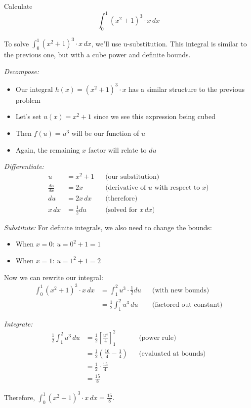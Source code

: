 \documentclass{article}
\begin{document}
  \begin{exercise}
    Calculate 
    \begin{equation}
      \int_0^1 (x^2 + 1)^3 \cdot x \,dx 
    \end{equation}
  \end{exercise}
  \begin{solution}
    To solve $\int_0^1 (x^2 + 1)^3 \cdot x \,dx$, we'll use u-substitution. This integral is similar to the previous one, but with a cube power and definite bounds.
    
    \textit{Decompose:}
    \begin{itemize}
      \item Our integral $h(x) = (x^2 + 1)^3 \cdot x$ has a similar structure to the previous problem
      \item Let's set $u(x) = x^2 + 1$ since we see this expression being cubed
      \item Then $f(u) = u^3$ will be our function of $u$
      \item Again, the remaining $x$ factor will relate to $du$
    \end{itemize}

    \textit{Differentiate:}
    \begin{align*}
      u &= x^2 + 1 && \text{(our substitution)} \\
      \frac{du}{dx} &= 2x && \text{(derivative of $u$ with respect to $x$)} \\
      du &= 2x\,dx && \text{(therefore)} \\
      x\,dx &= \frac{1}{2}du && \text{(solved for $x\,dx$)}
    \end{align*}

    \textit{Substitute:}
    For definite integrals, we also need to change the bounds:
    \begin{itemize}
      \item When $x = 0$: $u = 0^2 + 1 = 1$
      \item When $x = 1$: $u = 1^2 + 1 = 2$
    \end{itemize}
    
    Now we can rewrite our integral:
    \begin{align*}
      \int_0^1 (x^2 + 1)^3 \cdot x \,dx &= \int_1^2 u^3 \cdot \frac{1}{2}du && \text{(with new bounds)} \\
      &= \frac{1}{2}\int_1^2 u^3 \,du && \text{(factored out constant)}
    \end{align*}

    \textit{Integrate:}
    \begin{align*}
      \frac{1}{2}\int_1^2 u^3 \,du &= \frac{1}{2}\left[\frac{u^4}{4}\right]_1^2 && \text{(power rule)} \\
      &= \frac{1}{2}\left(\frac{16}{4} - \frac{1}{4}\right) && \text{(evaluated at bounds)} \\
      &= \frac{1}{2} \cdot \frac{15}{4} \\
      &= \frac{15}{8}
    \end{align*}

    Therefore, $\int_0^1 (x^2 + 1)^3 \cdot x \,dx = \frac{15}{8}$.
  \end{solution}
\end{document}
